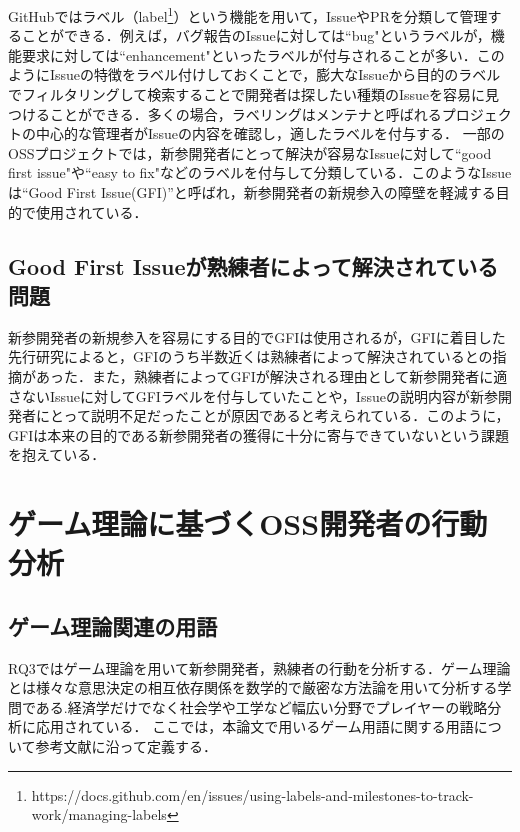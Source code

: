 \documentclass[11pt]{jreport}
\begin{document}
GitHubではラベル（label\footnote{https://docs.github.com/en/issues/using-labels-and-milestones-to-track-work/managing-labels}）という機能を用いて，IssueやPRを分類して管理することができる．例えば，バグ報告のIssueに対しては``bug"というラベルが，機能要求に対しては``enhancement"といったラベルが付与されることが多い．このようにIssueの特徴をラベル付けしておくことで，膨大なIssueから目的のラベルでフィルタリングして検索することで開発者は探したい種類のIssueを容易に見つけることができる．多くの場合，ラベリングはメンテナと呼ばれるプロジェクトの中心的な管理者がIssueの内容を確認し，適したラベルを付与する．
一部のOSSプロジェクトでは，新参開発者にとって解決が容易なIssueに対して``good first issue"や``easy to fix"などのラベルを付与して分類している．このようなIssueは``Good First Issue(GFI)”と呼ばれ，新参開発者の新規参入の障壁を軽減する目的で使用されている．

\subsection{Good First Issueが熟練者によって解決されている問題}
新参開発者の新規参入を容易にする目的でGFIは使用されるが，GFIに着目した先行研究\cite{GFI_half}によると，GFIのうち半数近くは熟練者によって解決されているとの指摘があった．また，熟練者によってGFIが解決される理由として新参開発者に適さないIssueに対してGFIラベルを付与していたことや，Issueの説明内容が新参開発者にとって説明不足だったことが原因であると考えられている．このように，GFIは本来の目的である新参開発者の獲得に十分に寄与できていないという課題を抱えている．

\section{ゲーム理論に基づくOSS開発者の行動分析 }

\subsection{ゲーム理論関連の用語 }

RQ3ではゲーム理論を用いて新参開発者，熟練者の行動を分析する．ゲーム理論とは様々な意思決定の相互依存関係を数学的で厳密な方法論を用いて分析する学問である.経済学だけでなく社会学や工学など幅広い分野でプレイヤーの戦略分析に応用されている．
ここでは，本論文で用いるゲーム用語に関する用語について参考文献\cite{game_theory}に沿って定義する．
\end{document}
